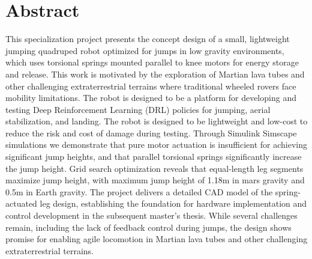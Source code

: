 
\section*{Abstract}

This specialization project presents the concept design of a small, lightweight jumping quadruped robot optimized for jumps in low gravity environments, which uses torsional springs mounted parallel to knee motors for energy storage and release. This work is motivated by the exploration of Martian lava tubes and other challenging extraterrestrial terrains where traditional wheeled rovers face mobility limitations. The robot is designed to be a platform for developing and testing Deep Reinforcement Learning (DRL) policies for jumping, aerial stabilization, and landing. The robot is designed to be lightweight and low-cost to reduce the risk and cost of damage during testing. Through Simulink Simscape simulations we demonstrate that pure motor actuation is insufficient for achieving significant jump heights, and that parallel torsional springs significantly increase the jump height. Grid search optimization reveals that equal-length leg segments maximize jump height, with maximum jump height of 1.18m in mars gravity and 0.5m in Earth gravity. The project delivers a detailed CAD model of the spring-actuated leg design, establishing the foundation for hardware implementation and control development in the subsequent master's thesis. While several challenges remain, including the lack of feedback control during jumps, the design shows promise for enabling agile locomotion in Martian lava tubes and other challenging extraterrestrial terrains.




